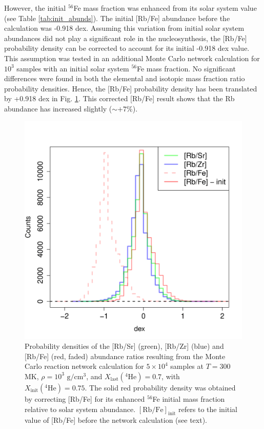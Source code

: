 However, the initial $^{56}$Fe mass fraction was enhanced from its solar system value (see Table \ref{tab:init_abunds}). The initial [Rb/Fe] abundance before the calculation was -0.918 dex. Assuming this variation from initial solar system abundances did not play a significant role in the nucleosynthesis, the [Rb/Fe] probability density can be corrected to account for its initial -0.918 dex value. This assumption was tested in an additional Monte Carlo network calculation for $10^{3}$ samples with an initial solar system $^{56}$Fe mass fraction. No significant differences were found in both the elemental and isotopic mass fraction ratio probability densities. Hence, the [Rb/Fe] probability density has been translated by +0.918 dex in Fig. \ref{fig:RbZr_Hist}. This corrected [Rb/Fe] result shows that the Rb abundance has increased slightly ($\sim +7\%$).

\begin{figure}[t]
\centering
\includegraphics[width=4.55in]{Chapter-3/figs/Hist_Ele_Dex_Ratio_ModFe.png}
\caption{\label{fig:RbZr_Hist}Probability densities of the [Rb/Sr] (green), [Rb/Zr] (blue) and [Rb/Fe] (red, faded) abundance ratios resulting from the Monte Carlo reaction network calculation for $5 \times 10^{4}$ samples at $T = 300$ MK, $\rho = 10^{3}$ $\mathrm{g}/\mathrm{cm}^{3}$, and $X_{\mathrm{last}}(^{4}\mathrm{He}) = 0.7$, with $X_{\mathrm{init}}(^{4}\mathrm{He}) = 0.75$. The solid red probability density was obtained by correcting [Rb/Fe] for its enhanced $^{56}$Fe initial mass fraction relative to solar system abundance. $[\mathrm{Rb}/\mathrm{Fe}]_{\mathrm{init}}$ refers to the initial value of [Rb/Fe] before the network calculation (see text).}
\end{figure}

